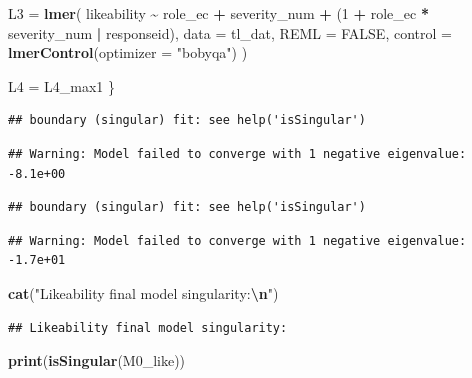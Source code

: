 \documentclass[
]{article}
\newenvironment{Shaded}{\begin{snugshade}}{\end{snugshade}}
\newcommand{\AttributeTok}[1]{\textcolor[rgb]{0.13,0.29,0.53}{#1}}
\newcommand{\ConstantTok}[1]{\textcolor[rgb]{0.56,0.35,0.01}{#1}}
\newcommand{\DecValTok}[1]{\textcolor[rgb]{0.00,0.00,0.81}{#1}}
\newcommand{\FunctionTok}[1]{\textcolor[rgb]{0.13,0.29,0.53}{\textbf{#1}}}
\newcommand{\NormalTok}[1]{#1}
\newcommand{\OtherTok}[1]{\textcolor[rgb]{0.56,0.35,0.01}{#1}}
\newcommand{\SpecialCharTok}[1]{\textcolor[rgb]{0.81,0.36,0.00}{\textbf{#1}}}
\newcommand{\StringTok}[1]{\textcolor[rgb]{0.31,0.60,0.02}{#1}}
\begin{document}
\begin{Shaded}
\begin{Highlighting}[]
\NormalTok{  L3 }\OtherTok{=} \FunctionTok{lmer}\NormalTok{(}
\NormalTok{    likeability }\SpecialCharTok{\textasciitilde{}}\NormalTok{ role\_ec }\SpecialCharTok{+}\NormalTok{ severity\_num }\SpecialCharTok{+}
\NormalTok{      (}\DecValTok{1} \SpecialCharTok{+}\NormalTok{ role\_ec }\SpecialCharTok{*}\NormalTok{ severity\_num }\SpecialCharTok{|}\NormalTok{ responseid),}
    \AttributeTok{data =}\NormalTok{ tl\_dat,}
    \AttributeTok{REML =} \ConstantTok{FALSE}\NormalTok{,}
    \AttributeTok{control =} \FunctionTok{lmerControl}\NormalTok{(}\AttributeTok{optimizer =} \StringTok{"bobyqa"}\NormalTok{)}
\NormalTok{  )}

\NormalTok{  L4 }\OtherTok{=}\NormalTok{ L4\_max1}
\NormalTok{\}}
\end{Highlighting}
\end{Shaded}

\begin{verbatim}
## boundary (singular) fit: see help('isSingular')
\end{verbatim}

\begin{verbatim}
## Warning: Model failed to converge with 1 negative eigenvalue: -8.1e+00
\end{verbatim}

\begin{verbatim}
## boundary (singular) fit: see help('isSingular')
\end{verbatim}

\begin{verbatim}
## Warning: Model failed to converge with 1 negative eigenvalue: -1.7e+01
\end{verbatim}

\begin{Shaded}
\begin{Highlighting}[]
\FunctionTok{cat}\NormalTok{(}\StringTok{"Likeability final model singularity:}\SpecialCharTok{\textbackslash{}n}\StringTok{"}\NormalTok{)}
\end{Highlighting}
\end{Shaded}

\begin{verbatim}
## Likeability final model singularity:
\end{verbatim}

\begin{Shaded}
\begin{Highlighting}[]
\FunctionTok{print}\NormalTok{(}\FunctionTok{isSingular}\NormalTok{(M0\_like))}
\end{Highlighting}
\end{Shaded}
\end{document}
